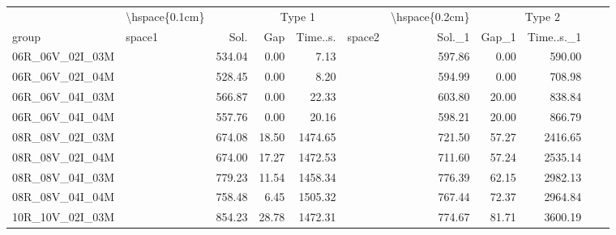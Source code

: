 
\begin{tabular}{llrrrlrrr}
\toprule
\multicolumn{1}{c}{} & \multicolumn{1}{c}{\textbackslash{}hspace\{0.1cm\}} & \multicolumn{4}{c}{Type 1} & \multicolumn{1}{c}{\textbackslash{}hspace\{0.2cm\}} & \multicolumn{4}{c}{Type 2} \\
\cmidrule(l{3pt}r{3pt}){2-2} \cmidrule(l{3pt}r{3pt}){3-6} \cmidrule(l{3pt}r{3pt}){7-7} \cmidrule(l{3pt}r{3pt}){8-11}
group & space1 & Sol. & Gap & Time..s. & space2 & Sol.\_1 & Gap\_1 & Time..s.\_1\\
\midrule
06R\_06V\_02I\_03M & \hspace{0.1cm} & 534.04 & 0.00 & 7.13 & \hspace{0.2cm} & 597.86 & 0.00 & 590.00\\
06R\_06V\_02I\_04M & \hspace{0.1cm} & 528.45 & 0.00 & 8.20 & \hspace{0.2cm} & 594.99 & 0.00 & 708.98\\
06R\_06V\_04I\_03M & \hspace{0.1cm} & 566.87 & 0.00 & 22.33 & \hspace{0.2cm} & 603.80 & 20.00 & 838.84\\
06R\_06V\_04I\_04M & \hspace{0.1cm} & 557.76 & 0.00 & 20.16 & \hspace{0.2cm} & 598.21 & 20.00 & 866.79\\
\addlinespace
08R\_08V\_02I\_03M & \hspace{0.1cm} & 674.08 & 18.50 & 1474.65 & \hspace{0.2cm} & 721.50 & 57.27 & 2416.65\\
08R\_08V\_02I\_04M & \hspace{0.1cm} & 674.00 & 17.27 & 1472.53 & \hspace{0.2cm} & 711.60 & 57.24 & 2535.14\\
08R\_08V\_04I\_03M & \hspace{0.1cm} & 779.23 & 11.54 & 1458.34 & \hspace{0.2cm} & 776.39 & 62.15 & 2982.13\\
08R\_08V\_04I\_04M & \hspace{0.1cm} & 758.48 & 6.45 & 1505.32 & \hspace{0.2cm} & 767.44 & 72.37 & 2964.84\\
\addlinespace
10R\_10V\_02I\_03M & \hspace{0.1cm} & 854.23 & 28.78 & 1472.31 & \hspace{0.2cm} & 774.67 & 81.71 & 3600.19\\

\end{tabular}
